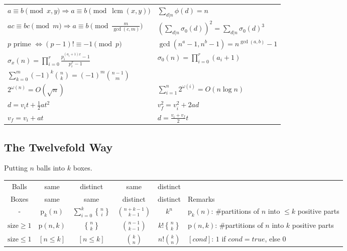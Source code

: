 \documentclass[8pt,a4paper,landscape,oneside]{amsart}
\DeclareMathOperator{\lcm}{lcm}
\DeclareRobustCommand{\stirling}{\genfrac\{\}{0pt}{}}
\begin{document}
\begin{multicols*}{3}
\begin{tabular}{ll}
    $a\equiv b\pmod{x,y} \Rightarrow a\equiv b\pmod{\lcm(x,y)}$ & $\sum_{d|n} \phi(d) = n$ \\
    $ac\equiv bc\pmod{m} \Rightarrow a\equiv b\pmod{\frac{m}{\gcd(c,m)}}$ & $(\sum_{d|n} \sigma_0(d))^2 = \sum_{d|n} \sigma_0(d)^3$ \\
    $p$ prime $\Leftrightarrow (p-1)!\equiv -1\pmod{p}$ & $\gcd(n^a-1,n^b-1) = n^{\gcd(a,b)}-1$ \\
    $\sigma_x(n) = \prod_{i=0}^{r} \frac{p_i^{(a_i + 1)x} - 1}{p_i^x - 1}$ & $\sigma_0(n) = \prod_{i=0}^r (a_i + 1)$ \\
    $\sum_{k=0}^m (-1)^k \binom{n}{k} = (-1)^m \binom{n-1}{m}$ & \\
    $2^{\omega(n)} = O(\sqrt{n})$ & $\sum_{i=1}^n 2^{\omega(i)} = O(n \log n)$ \\
    $d = v_i t + \frac{1}{2}at^2$ & $v_f^2 = v_i^2 + 2ad$ \\
    $v_f = v_i + at$ & $d = \frac{v_i + v_f}{2}t$ \\
  \end{tabular}
  \subsection{The Twelvefold Way}
    Putting $n$ balls into $k$ boxes.\\
  \begin{tabular}{@{}c|c|c|c|c|l@{}}
  Balls & same & distinct & same & distinct & \\
  Boxes & same & same & distinct & distinct & Remarks\\
  \hline
    - & $\mathrm{p}_k(n)$ & $\sum_{i=0}^k \stirling{n}{i}$ & $\binom{n+k-1}{k-1}$ & $k^n$ & $\mathrm{p}_k(n)$: \#partitions of $n$ into $\le k$ positive parts \\
    $\mathrm{size}\ge 1$ & $\mathrm{p}(n,k)$ & $\stirling{n}{k}$ & $\binom{n-1}{k-1}$ & $k!\stirling{n}{k}$ & $\mathrm{p}(n,k)$: \#partitions of $n$ into $k$ positive parts \\
    $\mathrm{size}\le 1$ & $[n \le k]$ & $[n \le k]$ & $\binom{k}{n}$ & $n!\binom{k}{n}$ & $[cond]$: $1$ if $cond=true$, else $0$\\
  \bottomrule
  \end{tabular}

\clearpage



\end{multicols*}
\end{document}
